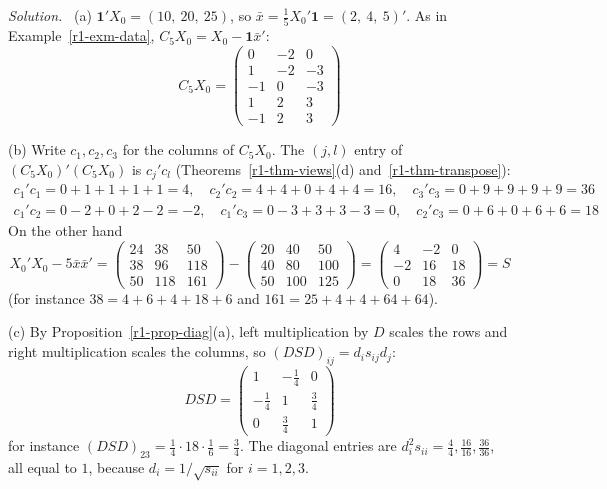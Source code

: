 \documentclass[12pt]{article}
\newcommand{\one}{\mathbf 1}
\theoremstyle{definition}
\newenvironment{solution}{\par\noindent\textit{Solution.}\ }{\par\smallskip}
\begin{document}
\begin{solution}
(a) \(\one'X_0=(10,\ 20,\ 25)\), so \(\bar x=\frac15X_0'\one=(2,\ 4,\ 5)'\). As in
Example~\ref{r1-exm-data}, \(C_5X_0=X_0-\one\bar x'\):
\[
C_5X_0=\begin{pmatrix}0&-2&0\\1&-2&-3\\-1&0&-3\\1&2&3\\-1&2&3\end{pmatrix}
\]

(b) Write \(c_1,c_2,c_3\) for the columns of \(C_5X_0\). The \((j,l)\) entry of
\((C_5X_0)'(C_5X_0)\) is \(c_j'c_l\) (Theorems~\ref{r1-thm-views}(d) and~\ref{r1-thm-transpose}):
\[
\begin{gathered}
c_1'c_1=0+1+1+1+1=4,\quad c_2'c_2=4+4+0+4+4=16,\quad c_3'c_3=0+9+9+9+9=36\\
c_1'c_2=0-2+0+2-2=-2,\quad c_1'c_3=0-3+3+3-3=0,\quad c_2'c_3=0+6+0+6+6=18
\end{gathered}
\]
On the other hand
\[
X_0'X_0-5\bar x\bar x'
=\begin{pmatrix}24&38&50\\38&96&118\\50&118&161\end{pmatrix}
-\begin{pmatrix}20&40&50\\40&80&100\\50&100&125\end{pmatrix}
=\begin{pmatrix}4&-2&0\\-2&16&18\\0&18&36\end{pmatrix}=S
\]
(for instance \(38=4+6+4+18+6\) and \(161=25+4+4+64+64\)).

(c) By Proposition~\ref{r1-prop-diag}(a), left multiplication by \(D\) scales the rows and right multiplication
scales the columns, so \((DSD)_{ij}=d_is_{ij}d_j\):
\[
DSD=\begin{pmatrix}1&-\frac14&0\\-\frac14&1&\frac34\\0&\frac34&1\end{pmatrix}
\]
for instance \((DSD)_{23}=\frac14\cdot18\cdot\frac16=\frac34\). The diagonal entries are
\(d_i^2s_{ii}=\frac44,\frac{16}{16},\frac{36}{36}\), all equal to \(1\), because
\(d_i=1/\sqrt{s_{ii}}\) for \(i=1,2,3\).
\end{solution}
\end{document}
